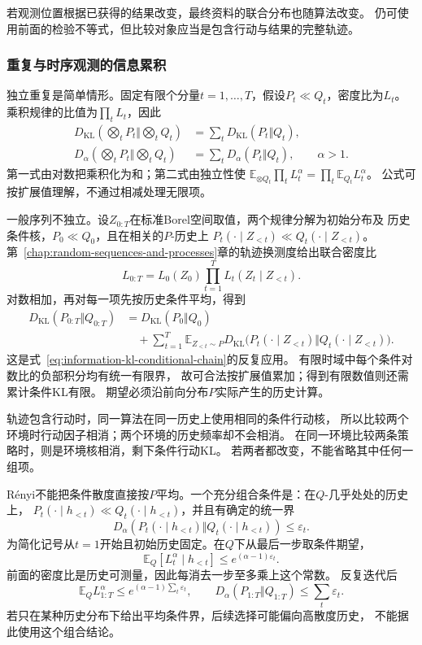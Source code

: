 若观测位置根据已获得的结果改变，最终资料的联合分布也随算法改变。
仍可使用前面的检验不等式，但比较对象应当是包含行动与结果的完整轨迹。

\subsubsection{重复与时序观测的信息累积}
\label{sec:information-sequential-accumulation}

独立重复是简单情形。固定有限个分量\(t=1,\ldots,T\)，假设\(P_t\ll Q_t\)，密度比为\(L_t\)。
乘积规律的比值为\(\prod_tL_t\)，因此
\[
\begin{aligned}
  D_{\mathrm{KL}}\left(\bigotimes_tP_t\Big\Vert\bigotimes_tQ_t\right)
     &=\sum_tD_{\mathrm{KL}}(P_t\Vert Q_t),\\
  D_\alpha\left(\bigotimes_tP_t\Big\Vert\bigotimes_tQ_t\right)
     &=\sum_tD_\alpha(P_t\Vert Q_t),\qquad\alpha>1.
\end{aligned}
\]
第一式由对数把乘积化为和；第二式由独立性使
\(\mathbb E_{\otimes Q_t}\prod_tL_t^\alpha=\prod_t\mathbb E_{Q_t}L_t^\alpha\)。
公式可按扩展值理解，不通过相减处理无限项。

一般序列不独立。设\(Z_{0:T}\)在标准Borel空间取值，两个规律分解为初始分布及
历史条件核，\(P_0\ll Q_0\)，且在相关的\(P\)-历史上
\(P_t(\cdot\mid Z_{<t})\ll Q_t(\cdot\mid Z_{<t})\)。
第~\ref{chap:random-sequences-and-processes}章的轨迹换测度给出联合密度比
\[
  L_{0:T}=L_0(Z_0)\prod_{t=1}^T L_t(Z_t\mid Z_{<t}).
\]
对数相加，再对每一项先按历史条件平均，得到
\begin{equation}
\begin{aligned}
 D_{\mathrm{KL}}(P_{0:T}\Vert Q_{0:T})
 &=D_{\mathrm{KL}}(P_0\Vert Q_0)\\
 &\quad+\sum_{t=1}^T\mathbb E_{Z_{<t}\sim P}
 D_{\mathrm{KL}}\bigl(P_t(\cdot\mid Z_{<t})
                     \Vert Q_t(\cdot\mid Z_{<t})\bigr).
\end{aligned}
\label{eq:information-trajectory-kl-chain}
\end{equation}
这是式~\eqref{eq:information-kl-conditional-chain}的反复应用。
有限时域中每个条件对数比的负部积分均有统一有限界，
故可合法按扩展值累加；得到有限数值则还需累计条件KL有限。
期望必须沿前向分布\(P\)实际产生的历史计算。

轨迹包含行动时，同一算法在同一历史上使用相同的条件行动核，
所以比较两个环境时行动因子相消；两个环境的历史频率却不会相消。
在同一环境比较两条策略时，则是环境核相消，剩下条件行动KL。
若两者都改变，不能省略其中任何一组项。

Rényi不能把条件散度直接按\(P\)平均。一个充分组合条件是：在\(Q\)-几乎处处的历史上，
\(P_t(\cdot\mid h_{<t})\ll Q_t(\cdot\mid h_{<t})\)，并且有确定的统一界
\[
  D_\alpha(P_t(\cdot\mid h_{<t})\Vert Q_t(\cdot\mid h_{<t}))
  \leq\varepsilon_t.
\]
为简化记号从\(t=1\)开始且初始历史固定。在\(Q\)下从最后一步取条件期望，
\[
  \mathbb E_Q[L_t^\alpha\mid h_{<t}]
       \leq e^{(\alpha-1)\varepsilon_t}.
\]
前面的密度比是历史可测量，因此每消去一步至多乘上这个常数。
反复迭代后
\[
  \mathbb E_Q L_{1:T}^{\alpha}
  \leq e^{(\alpha-1)\sum_t\varepsilon_t},\qquad
  D_\alpha(P_{1:T}\Vert Q_{1:T})\leq\sum_t\varepsilon_t.
\]
若只在某种历史分布下给出平均条件界，后续选择可能偏向高散度历史，
不能据此使用这个组合结论。

